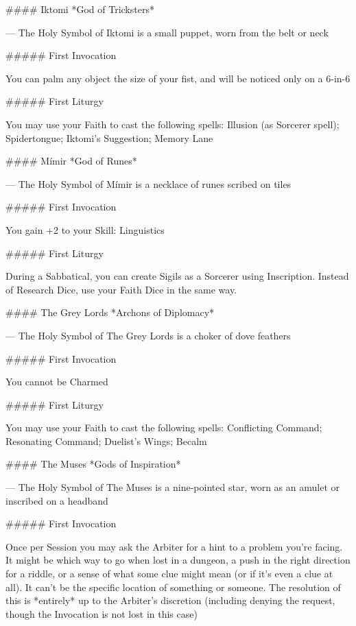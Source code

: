 #### Iktomi
*God of Tricksters*

---
The Holy Symbol of Iktomi is a small puppet, worn from the belt or neck

##### First Invocation

You can palm any object the size of your fist, and will be noticed only on a 6-in-6

##### First Liturgy

You may use your Faith to cast the following spells: Illusion (as Sorcerer spell); Spidertongue; Iktomi's Suggestion; Memory Lane






#### Mímir
*God of Runes*

---
The Holy Symbol of Mímir is a necklace of runes scribed on tiles

##### First Invocation

You gain +2 to your Skill: Linguistics

##### First Liturgy

During a Sabbatical, you can create Sigils as a Sorcerer using Inscription.  Instead of Research Dice, use your Faith Dice in the same way.  




#### The Grey Lords
*Archons of Diplomacy*

---
The Holy Symbol of The Grey Lords is a choker of dove feathers

##### First Invocation

You cannot be Charmed

##### First Liturgy

You may use your Faith to cast the following spells: Conflicting Command; Resonating Command; Duelist's Wings; Becalm




#### The Muses
*Gods of Inspiration*

---
The Holy Symbol of The Muses is a nine-pointed star, worn as an amulet or inscribed on a headband

##### First Invocation

Once per Session you may ask the Arbiter for a hint to a problem you're facing. It might be which way to go when lost in a dungeon, a push in the right direction for a riddle, or a sense of what some clue might mean (or if it's even a clue at all). It can't be the specific location of something or someone. The resolution of this is *entirely* up to the Arbiter's discretion (including denying the request, though the Invocation is not lost in this case)

